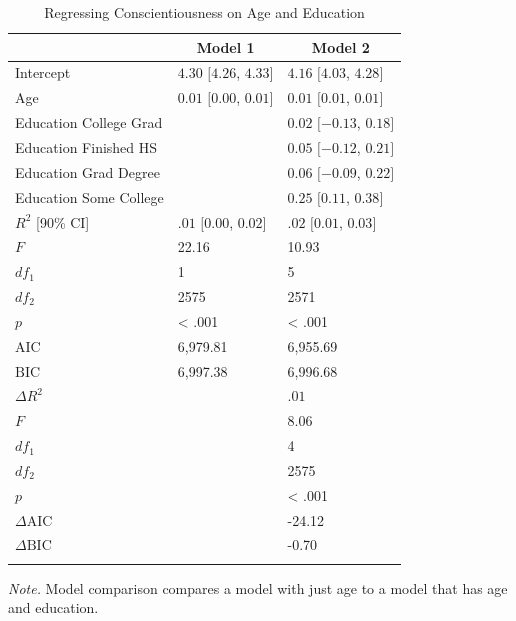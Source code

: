 \documentclass[
  english,
  man]{apa6}
\begin{document}
\begin{table}[tbp]

\begin{center}
\begin{threeparttable}

\caption{\label{tab:reg-models-tbl}Regressing Conscientiousness on Age and Education}

\begin{tabular}{lll}
\toprule
 & \multicolumn{1}{c}{Model 1} & \multicolumn{1}{c}{Model 2}\\
\midrule
Intercept & $4.30$ $[4.26$, $4.33]$ & $4.16$ $[4.03$, $4.28]$\\
Age & $0.01$ $[0.00$, $0.01]$ & $0.01$ $[0.01$, $0.01]$\\
Education College Grad &  & $0.02$ $[-0.13$, $0.18]$\\
Education Finished HS &  & $0.05$ $[-0.12$, $0.21]$\\
Education Grad Degree &  & $0.06$ $[-0.09$, $0.22]$\\
Education Some College &  & $0.25$ $[0.11$, $0.38]$\\
$R^2$ [90\% CI] & $.01$ $[0.00$, $0.02]$ & $.02$ $[0.01$, $0.03]$\\
$F$ & 22.16 & 10.93\\
$df_1$ & 1 & 5\\
$df_2$ & 2575 & 2571\\
$p$ & < .001 & < .001\\
$\mathrm{AIC}$ & 6,979.81 & 6,955.69\\
$\mathrm{BIC}$ & 6,997.38 & 6,996.68\\
$\Delta R^2$ &  & $.01$\\
$F$ &  & 8.06\\
$df_1$ &  & 4\\
$df_2$ &  & 2575\\
$p$ &  & < .001\\
$\Delta \mathrm{AIC}$ &  & -24.12\\
$\Delta \mathrm{BIC}$ &  & -0.70\\
\bottomrule
\addlinespace
\end{tabular}

\begin{tablenotes}[para]
\normalsize{\textit{Note.} Model comparison compares a model with just age to a model that has age and education.}
\end{tablenotes}

\end{threeparttable}
\end{center}

\end{table}
\end{document}
